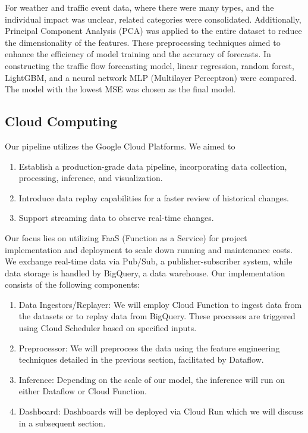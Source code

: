For weather and traffic event data, where there were many types, and the individual impact was unclear, related categories were consolidated. Additionally, Principal Component Analysis (PCA) was applied to the entire dataset to reduce the dimensionality of the features. These preprocessing techniques aimed to enhance the efficiency of model training and the accuracy of forecasts.
In constructing the traffic flow forecasting model, linear regression, random forest, LightGBM, and a neural network MLP (Multilayer Perceptron) were compared. The model with the lowest MSE was chosen as the final model.

\subsection{Cloud Computing}
Our pipeline utilizes the Google Cloud Platforms. We aimed to 
\begin{enumerate}
    \item Establish a production-grade data pipeline, incorporating data collection, processing, inference, and visualization.
    \item Introduce data replay capabilities for a faster review of historical changes.
    \item Support streaming data to observe real-time changes.
\end{enumerate}

Our focus lies on utilizing FaaS (Function as a Service) for project implementation and deployment to scale down running and maintenance costs. We exchange real-time data via Pub/Sub, a publisher-subscriber system, while data storage is handled by BigQuery, a data warehouse. Our implementation consists of the following components:

\begin{enumerate}
    \item Data Ingestors/Replayer: We will employ Cloud Function to ingest data from the datasets or to replay data from BigQuery. These processes are triggered using Cloud Scheduler based on specified inputs.
    \item Preprocessor: We will preprocess the data using the feature engineering techniques detailed in the previous section, facilitated by Dataflow.
    \item Inference: Depending on the scale of our model, the inference will run on either Dataflow or Cloud Function.
    \item Dashboard: Dashboards will be deployed via Cloud Run which we will discuss in a subsequent section.
\end{enumerate}

